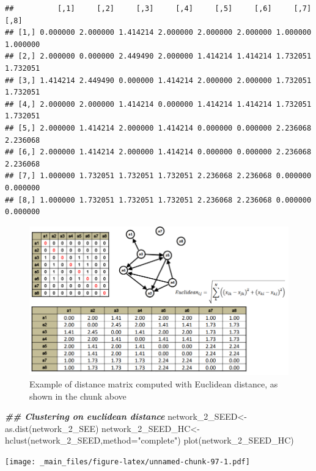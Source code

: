 \documentclass[
  notitlepage,
  onecolumn,
  openany]{book}
\newenvironment{Shaded}{\begin{snugshade}}{\end{snugshade}}
\newcommand{\AttributeTok}[1]{\textcolor[rgb]{0.77,0.63,0.00}{#1}}
\newcommand{\DocumentationTok}[1]{\textcolor[rgb]{0.56,0.35,0.01}{\textbf{\textit{#1}}}}
\newcommand{\FunctionTok}[1]{\textcolor[rgb]{0.00,0.00,0.00}{#1}}
\newcommand{\NormalTok}[1]{#1}
\newcommand{\OtherTok}[1]{\textcolor[rgb]{0.56,0.35,0.01}{#1}}
\newcommand{\StringTok}[1]{\textcolor[rgb]{0.31,0.60,0.02}{#1}}
\begin{document}
\begin{verbatim}
##          [,1]     [,2]     [,3]     [,4]     [,5]     [,6]     [,7]     [,8]
## [1,] 0.000000 2.000000 1.414214 2.000000 2.000000 2.000000 1.000000 1.000000
## [2,] 2.000000 0.000000 2.449490 2.000000 1.414214 1.414214 1.732051 1.732051
## [3,] 1.414214 2.449490 0.000000 1.414214 2.000000 2.000000 1.732051 1.732051
## [4,] 2.000000 2.000000 1.414214 0.000000 1.414214 1.414214 1.732051 1.732051
## [5,] 2.000000 1.414214 2.000000 1.414214 0.000000 0.000000 2.236068 2.236068
## [6,] 2.000000 1.414214 2.000000 1.414214 0.000000 0.000000 2.236068 2.236068
## [7,] 1.000000 1.732051 1.732051 1.732051 2.236068 2.236068 0.000000 0.000000
## [8,] 1.000000 1.732051 1.732051 1.732051 2.236068 2.236068 0.000000 0.000000
\end{verbatim}

\begin{figure}[h!]

{\centering \includegraphics[width=0.7\linewidth]{images/11-Subgroups and Structural Equivalence/Untitled 10} 

}

\caption{Example of distance matrix computed with Euclidean distance, as shown in the chunk above}\label{fig:unnamed-chunk-96}
\end{figure}

\begin{Shaded}
\begin{Highlighting}[]
\DocumentationTok{\#\# Clustering on euclidean distance}
\NormalTok{network\_2\_SEED}\OtherTok{\textless{}{-}}\FunctionTok{as.dist}\NormalTok{(network\_2\_SEE)}
\NormalTok{network\_2\_SEED\_HC}\OtherTok{\textless{}{-}}\FunctionTok{hclust}\NormalTok{(network\_2\_SEED,}\AttributeTok{method=}\StringTok{"complete"}\NormalTok{)}
\FunctionTok{plot}\NormalTok{(network\_2\_SEED\_HC)}
\end{Highlighting}
\end{Shaded}

\texttt{[image: \_main\_files/figure-latex/unnamed-chunk-97-1.pdf]}
\end{document}
